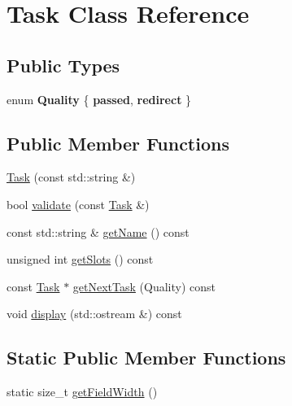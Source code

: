 \hypertarget{classTask}{}\section{Task Class Reference}
\label{classTask}
\subsection*{Public Types}
\begin{DoxyCompactItemize}
\item 
\mbox{\label{classTask_a6b8b1fc5858cbd77055e79d6381282fb}} 
enum {\bfseries Quality} \{ {\bfseries passed}, 
{\bfseries redirect}
 \}
\end{DoxyCompactItemize}
\subsection*{Public Member Functions}
\begin{DoxyCompactItemize}
\item 
\mbox{\hyperlink{classTask_ace3ff25451f6d46f6cc0f2d7ed4b16ef}{Task}} (const std\+::string \&)
\item 
bool \mbox{\hyperlink{classTask_a974eb3143ac070fd67495f3c4a108a96}{validate}} (const \mbox{\hyperlink{classTask}{Task}} \&)
\item 
const std\+::string \& \mbox{\hyperlink{classTask_af12eb32f3bc744e6fa0480ca99c11f2c}{get\+Name}} () const
\item 
unsigned int \mbox{\hyperlink{classTask_a67589413dbb0d5ffa3b2f08c6fa461ea}{get\+Slots}} () const
\item 
const \mbox{\hyperlink{classTask}{Task}} $\ast$ \mbox{\hyperlink{classTask_acf6851078d506896872fa7cc6476e5bf}{get\+Next\+Task}} (Quality) const
\item 
void \mbox{\hyperlink{classTask_aff00aecd7c14bd02434b76ad10a656a2}{display}} (std\+::ostream \&) const
\end{DoxyCompactItemize}
\subsection*{Static Public Member Functions}
\begin{DoxyCompactItemize}
\item 
static size\+\_\+t \mbox{\hyperlink{classTask_a18f265f8b4a37e5ed047034c2558068b}{get\+Field\+Width}} ()
\end{DoxyCompactItemize}


